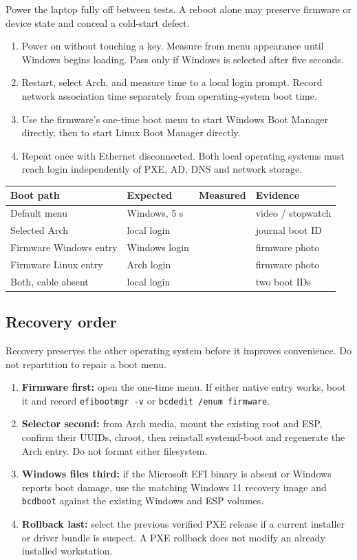 Power the laptop fully off between tests. A reboot alone may preserve firmware
or device state and conceal a cold-start defect.

\begin{enumerate}
\item Power on without touching a key. Measure from menu appearance until
Windows begins loading. Pass only if Windows is selected after five seconds.
\item Restart, select Arch, and measure time to a local login prompt. Record
network association time separately from operating-system boot time.
\item Use the firmware's one-time boot menu to start Windows Boot Manager
directly, then to start Linux Boot Manager directly.
\item Repeat once with Ethernet disconnected. Both local operating systems must
reach login independently of PXE, AD, DNS and network storage.
\end{enumerate}

\begin{tabularx}{\linewidth}{@{}p{.27\linewidth}p{.20\linewidth}p{.24\linewidth}L@{}}
\toprule
\textbf{Boot path} & \textbf{Expected} & \textbf{Measured} & \textbf{Evidence}\\
\midrule
Default menu & Windows, 5 s & & video / stopwatch\\
Selected Arch & local login & & journal boot ID\\
Firmware Windows entry & Windows login & & firmware photo\\
Firmware Linux entry & Arch login & & firmware photo\\
Both, cable absent & local login & & two boot IDs\\
\bottomrule
\end{tabularx}

\subsection{Recovery order}

Recovery preserves the other operating system before it improves convenience.
Do not repartition to repair a boot menu.

\begin{enumerate}
\item \textbf{Firmware first:} open the one-time menu. If either native entry
works, boot it and record \texttt{efibootmgr -v} or
\texttt{bcdedit /enum firmware}.
\item \textbf{Selector second:} from Arch media, mount the existing root and
ESP, confirm their UUIDs, chroot, then reinstall systemd-boot and regenerate
the Arch entry. Do not format either filesystem.
\item \textbf{Windows files third:} if the Microsoft EFI binary is absent or
Windows reports boot damage, use the matching Windows 11 recovery image and
\texttt{bcdboot} against the existing Windows and ESP volumes.
\item \textbf{Rollback last:} select the previous verified PXE release if a
current installer or driver bundle is suspect. A PXE rollback does not modify
an already installed workstation.
\end{enumerate}

